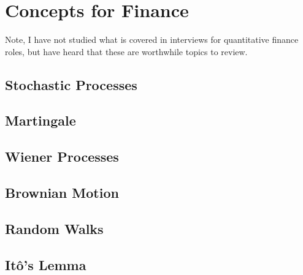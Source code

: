 \chapter{Concepts for Finance}
\label{finance}

Note, I have not studied what is covered in interviews for quantitative finance roles,
but have heard that these are worthwhile topics to review.

\section{Stochastic Processes}
\label{finance:sp}

\section{Martingale}
\label{finance:martingale}

\section{Wiener Processes}
\label{finance:wiener}

\section{Brownian Motion}
\label{finance:brownian}

\section{Random Walks}
\label{finance:rand_walk}

\section{It\^o's Lemma}
\label{finance:ito_lemma}

